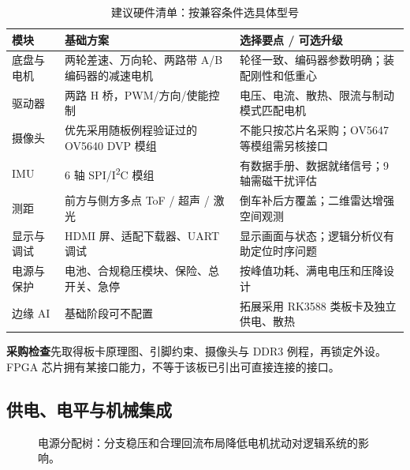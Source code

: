 \documentclass[UTF8,a4paper,zihao=-4,fontset=fandol]{ctexart}
\newcommand{\warn}[2]{\par\smallskip\noindent\colorbox{Warm}{\parbox{\dimexpr\linewidth-2\fboxsep\relax}{\small\textbf{\color{Amber}#1}\quad #2}}\par\smallskip}
\newcommand{\nextpage}{\clearpage}
\begin{document}
\begin{table}[H]\small
\caption{建议硬件清单：按兼容条件选具体型号}
\begin{tabularx}{\linewidth}{@{}L{2.4cm}L{4.9cm}Y@{}}\toprule
\textbf{模块} & \textbf{基础方案} & \textbf{选择要点 / 可选升级}\\\midrule
底盘与电机 & 两轮差速、万向轮、两路带 A/B 编码器的减速电机 & 轮径一致、编码器参数明确；装配刚性和低重心\\
驱动器 & 两路 H 桥，PWM/方向/使能控制 & 电压、电流、散热、限流与制动模式匹配电机\\
摄像头 & 优先采用随板例程验证过的 OV5640 DVP 模组 & 不能只按芯片名采购；OV5647 等模组需另核接口\\
IMU & 6 轴 SPI/I\textsuperscript{2}C 模组 & 有数据手册、数据就绪信号；9 轴需磁干扰评估\\
测距 & 前方与侧方多点 ToF / 超声 / 激光 & 倒车补后方覆盖；二维雷达增强空间观测\\
显示与调试 & HDMI 屏、适配下载器、UART 调试 & 显示画面与状态；逻辑分析仪有助定位时序问题\\
电源与保护 & 电池、合规稳压模块、保险、总开关、急停 & 按峰值功耗、满电电压和压降设计\\
边缘 AI & 基础阶段可不配置 & 拓展采用 RK3588 类板卡及独立供电、散热\\\bottomrule
\end{tabularx}
\end{table}

\warn{采购检查}{先取得板卡原理图、引脚约束、摄像头与 DDR3 例程，再锁定外设。FPGA 芯片拥有某接口能力，不等于该板已引出可直接连接的接口。}

\nextpage
\subsection{供电、电平与机械集成}

\begin{figure}[H]\centering
{}
\caption{电源分配树：分支稳压和合理回流布局降低电机扰动对逻辑系统的影响。}\label{fig:power}
\end{figure}
\end{document}

